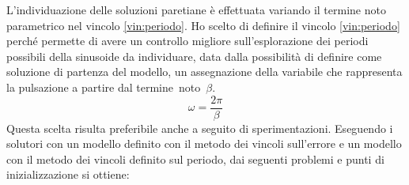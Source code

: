 \documentclass[a4paper,12pt]{report}
\begin{document}
L'individuazione delle soluzioni paretiane è effettuata variando il termine noto parametrico nel vincolo \eqref{vin:periodo}.
Ho scelto di definire il vincolo \eqref{vin:periodo} perché permette di avere un controllo migliore sull'esplorazione dei periodi possibili della sinusoide da individuare, data dalla possibilità di definire come soluzione di partenza del modello, un assegnazione della variabile che rappresenta la pulsazione a partire dal termine~noto~$\beta $.
\begin{equation}
  \omega = \frac{2\pi}{\beta}
\end{equation}
Questa scelta risulta preferibile anche a seguito di sperimentazioni. Eseguendo i solutori con un modello definito con il metodo dei vincoli sull'errore e un modello con il metodo dei vincoli definito sul periodo, dai seguenti problemi e punti di inizializzazione si ottiene:
\end{document}
